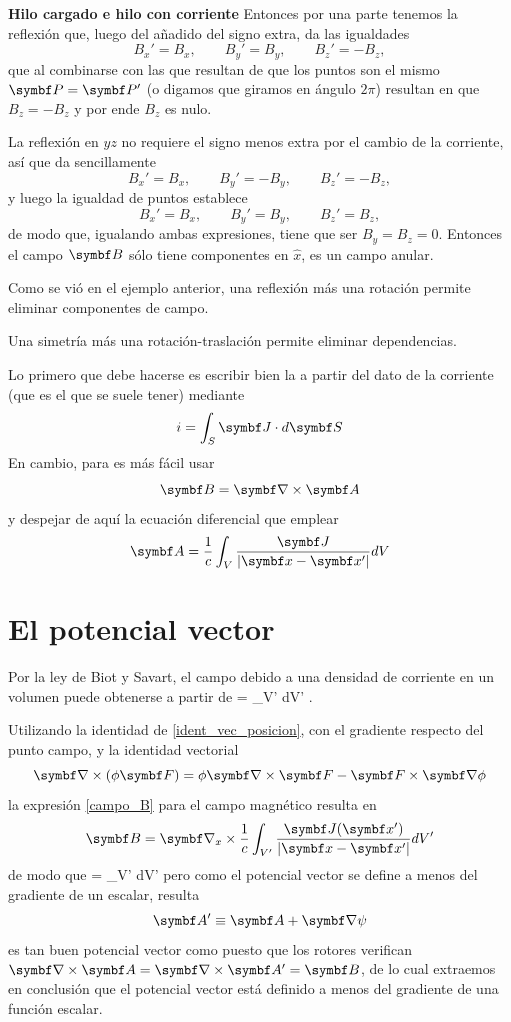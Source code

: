 \documentclass[10pt,oneside]{CBFT_book}
\begin{document}
\begin{ejemplo}{\bf Hilo cargado e hilo con corriente}
Entonces por una parte tenemos la reflexión que, luego del añadido del signo extra, da las igualdades 
\[
	B_x' = B_x, \qquad B_y' = B_y, \qquad B_z' = -B_z,
\]
que al combinarse con las que resultan de que los puntos son el mismo $\vb{P}=\vb{P}'$ (o digamos que 
giramos en ángulo $2\pi$) resultan en que $B_z = -B_z$ y por ende $B_z$ es nulo.

La reflexión en $yz$ no requiere el signo menos extra por el cambio de la corriente, así que da sencillamente 
\[
	B_x' = B_x, \qquad B_y' = -B_y, \qquad B_z' = -B_z,
\]
y luego la igualdad de puntos establece 
\[
	B_x' = B_x, \qquad B_y' = B_y, \qquad B_z' = B_z,
\]
de modo que, igualando ambas expresiones, tiene que ser $ B_y = B_z = 0 $. Entonces el campo $\vb{B}$ sólo
tiene componentes en $\hat{x}$, es un campo anular.
\end{ejemplo}



Como se vió en el ejemplo anterior, una reflexión más una rotación permite eliminar componentes 
de campo.


Una simetría más una rotación-traslación permite eliminar dependencias.

Lo primero que debe hacerse es escribir bien la  a partir del dato de la corriente
(que es el que se suele tener) mediante
\[
	i = \int_S \vb{J} \cdot d \vb{S}
\]
En cambio, para  es más fácil usar
\[
	\vb{B} = \rotorm{A}
\]
y despejar de aquí la ecuación diferencial que emplear
\[
	\vb{A} = \frac{1}{c} \int_V \frac{\vb{J}}{|\vb{x}-\vb{x}'|} dV
\]


\section{El potencial vector}

Por la ley de Biot y Savart, el campo  debido a una densidad 
de corriente en un volumen puede obtenerse a partir de
\be
	 = 
	 \int_{V'}  dV' .
	\label{campo_B}
\ee

Utilizando la identidad de \eqref{ident_vec_posicion}, con el gradiente respecto del punto campo,
y la identidad vectorial
\[
	\Nabla \times (\phi \vb{F} ) = \phi \rotorm{F} - \vb{F} \times \Nabla \phi
\]
la expresión \eqref{campo_B} para el campo magnético resulta en 
\[
	\vb{B} = \Nabla_x \times \frac{1}{c} \int_{V'} \frac{\vb{J}(\vb{x}')}{|\vb{x}-\vb{x}'|} dV'
\]
de modo que
\be
	 =  \int_{V'}  dV'
	\label{potvec}
\ee
pero como el potencial vector se define a menos del gradiente de un escalar, resulta
\[
	\vb{A}' \equiv \vb{A} + \Nabla \psi
\]
es tan buen potencial vector como  puesto que los rotores verifican $\rotorm{A}=\rotorm{A}'=\vb{B}$,
de lo cual extraemos en conclusión que el potencial vector está definido a menos del gradiente de una
función escalar.
\end{document}
